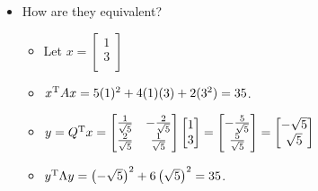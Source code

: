 \documentclass{article}
\begin{document}
\begin{itemize}
\begin{itemize}
\begin{center}
        \end{center}
    \end{itemize}
    \item How are they equivalent?
    \begin{itemize}
        \item Let $
            x=
            \begin{bmatrix}
                1\\
                3\\
            \end{bmatrix}
        $
        \item $x^{\text{T}} Ax = 5(1)^2+4(1)(3)+2(3^2) = 35$.
        \item $
            y = Q^{\text{T}} x =
            \begin{bmatrix}
                \frac{1}{\sqrt{5}} & -\frac{2}{\sqrt{5}}\\
                \frac{2}{\sqrt{5}} & \frac{1}{\sqrt{5}}\\
            \end{bmatrix}
            \begin{bmatrix}
                1\\
                3\\
            \end{bmatrix}
            =
            \begin{bmatrix}
                -\frac{5}{\sqrt{5}}\\
                \frac{5}{\sqrt{5}}\\
            \end{bmatrix}
            =
            \begin{bmatrix}
                -\sqrt{5}\\
                \sqrt{5}\\
            \end{bmatrix}
        $
        \item $y^{\text{T}} \Lambda y = \left( -\sqrt{5} \right)^2+6\left( \sqrt{5} \right)^2 = 35$.
    \end{itemize}
\end{itemize}
\end{document}
